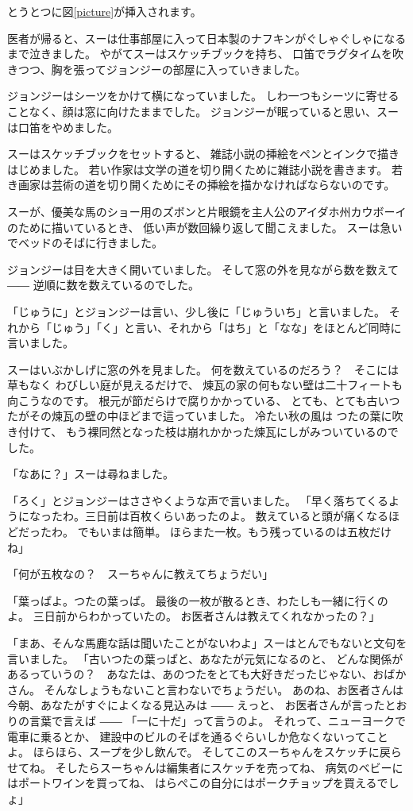 とうとつに図\ref{picture}が挿入されます。

医者が帰ると、スーは仕事部屋に入って日本製のナフキンがぐしゃぐしゃになるまで泣きました。 やがてスーはスケッチブックを持ち、 口笛でラグタイムを吹きつつ、胸を張ってジョンジーの部屋に入っていきました。

ジョンジーはシーツをかけて横になっていました。 しわ一つもシーツに寄せることなく、顔は窓に向けたままでした。 ジョンジーが眠っていると思い、スーは口笛をやめました。

スーはスケッチブックをセットすると、 雑誌小説の挿絵をペンとインクで描きはじめました。 若い作家は文学の道を切り開くために雑誌小説を書きます。 若き画家は芸術の道を切り開くためにその挿絵を描かなければならないのです。

スーが、優美な馬のショー用のズボンと片眼鏡を主人公のアイダホ州カウボーイのために描いているとき、 低い声が数回繰り返して聞こえました。 スーは急いでベッドのそばに行きました。

ジョンジーは目を大きく開いていました。 そして窓の外を見ながら数を数えて ―― 逆順に数を数えているのでした。

「じゅうに」とジョンジーは言い、少し後に「じゅういち」と言いました。 それから「じゅう」「く」と言い、それから「はち」と「なな」をほとんど同時に言いました。

スーはいぶかしげに窓の外を見ました。 何を数えているのだろう？　そこには草もなく わびしい庭が見えるだけで、 煉瓦の家の何もない壁は二十フィートも向こうなのです。 根元が節だらけで腐りかかっている、 とても、とても古いつたがその煉瓦の壁の中ほどまで這っていました。 冷たい秋の風は つたの葉に吹き付けて、 もう裸同然となった枝は崩れかかった煉瓦にしがみついているのでした。

「なあに？」スーは尋ねました。

「ろく」とジョンジーはささやくような声で言いました。 「早く落ちてくるようになったわ。三日前は百枚くらいあったのよ。 数えていると頭が痛くなるほどだったわ。 でもいまは簡単。 ほらまた一枚。もう残っているのは五枚だけね」

「何が五枚なの？　スーちゃんに教えてちょうだい」

「葉っぱよ。つたの葉っぱ。 最後の一枚が散るとき、わたしも一緒に行くのよ。 三日前からわかっていたの。 お医者さんは教えてくれなかったの？」

「まあ、そんな馬鹿な話は聞いたことがないわよ」スーはとんでもないと文句を言いました。 「古いつたの葉っぱと、あなたが元気になるのと、 どんな関係があるっていうの？　あなたは、あのつたをとても大好きだったじゃない、おばかさん。 そんなしょうもないこと言わないでちょうだい。 あのね、お医者さんは今朝、あなたがすぐによくなる見込みは ―― えっと、 お医者さんが言ったとおりの言葉で言えば ―― 「一に十だ」って言うのよ。 それって、ニューヨークで電車に乗るとか、 建設中のビルのそばを通るぐらいしか危なくないってことよ。 ほらほら、スープを少し飲んで。 そしてこのスーちゃんをスケッチに戻らせてね。 そしたらスーちゃんは編集者にスケッチを売ってね、 病気のベビーにはポートワインを買ってね、 はらぺこの自分にはポークチョップを買えるでしょ」

